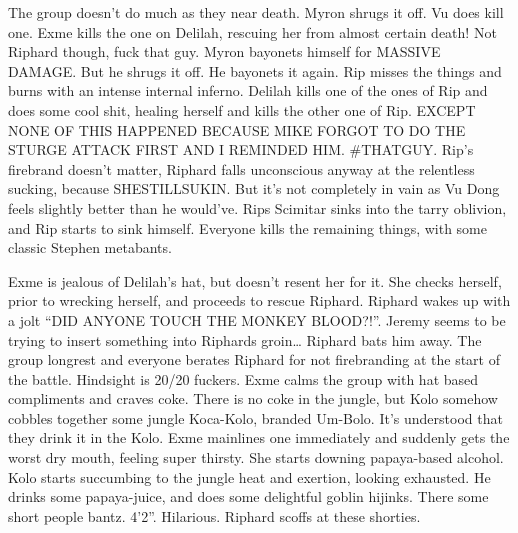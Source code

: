 \begin{multicols}{2}
The group doesn’t do much as they near death. Myron shrugs it off. Vu does kill one. Exme kills the one on Delilah, rescuing her from almost certain death! Not Riphard though, fuck that guy. Myron bayonets himself for MASSIVE DAMAGE. But he shrugs it off. He bayonets it again. Rip misses the things and burns with an intense internal inferno. Delilah kills one of the ones of Rip and does some cool shit, healing herself and kills the other one of Rip. EXCEPT NONE OF THIS HAPPENED BECAUSE MIKE FORGOT TO DO THE STURGE ATTACK FIRST AND I REMINDED HIM. \#THATGUY. Rip’s firebrand doesn’t matter, Riphard falls unconscious anyway at the relentless sucking, because SHESTILLSUKIN. But it’s not completely in vain as Vu Dong feels slightly better than he would’ve. Rips Scimitar sinks into the tarry oblivion, and Rip starts to sink himself. Everyone kills the remaining things, with some classic Stephen metabants.\medskip

Exme is jealous of Delilah’s hat, but doesn’t resent her for it. She checks herself, prior to wrecking herself, and proceeds to rescue Riphard. Riphard wakes up with a jolt “DID ANYONE TOUCH THE MONKEY BLOOD?!”. Jeremy seems to be trying to insert something into Riphards groin… Riphard bats him away. The group longrest and everyone berates Riphard for not firebranding at the start of the battle. Hindsight is 20/20 fuckers. Exme calms the group with hat based compliments and craves coke. There is no coke in the jungle, but Kolo somehow cobbles together some jungle Koca-Kolo, branded Um-Bolo. It’s understood that they drink it in the Kolo. Exme mainlines one immediately and suddenly gets the worst dry mouth, feeling super thirsty. She starts downing papaya-based alcohol. Kolo starts succumbing to the jungle heat and exertion, looking exhausted. He drinks some papaya-juice, and does some delightful goblin hijinks. There some short people bantz. 4’2”. Hilarious. Riphard scoffs at these shorties.\medskip


\end{multicols}
